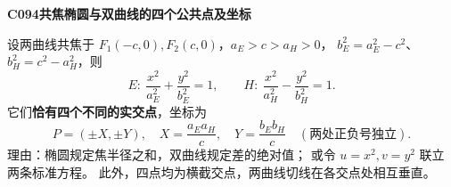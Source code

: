\textbf{C094\quad 共焦椭圆与双曲线的四个公共点及坐标}

设两曲线共焦于 $F_1(-c,0),F_2(c,0)$，$a_E>c>a_H>0$，
$b_E^2=a_E^2-c^2$、$b_H^2=c^2-a_H^2$，则
\[
E:\ \frac{x^2}{a_E^2}+\frac{y^2}{b_E^2}=1,\qquad
H:\ \frac{x^2}{a_H^2}-\frac{y^2}{b_H^2}=1.
\]
它们\textbf{恰有四个不同的实交点}，坐标为
\[
\boxed{P=(\pm X,\pm Y),\quad
X=\frac{a_Ea_H}{c},\quad
Y=\frac{b_Eb_H}{c}}
\quad(\text{两处正负号独立}).
\]
理由：椭圆规定焦半径之和，双曲线规定差的绝对值；
或令 $u=x^2,v=y^2$ 联立两条标准方程。
此外，四点均为横截交点，两曲线切线在各交点处相互垂直。
